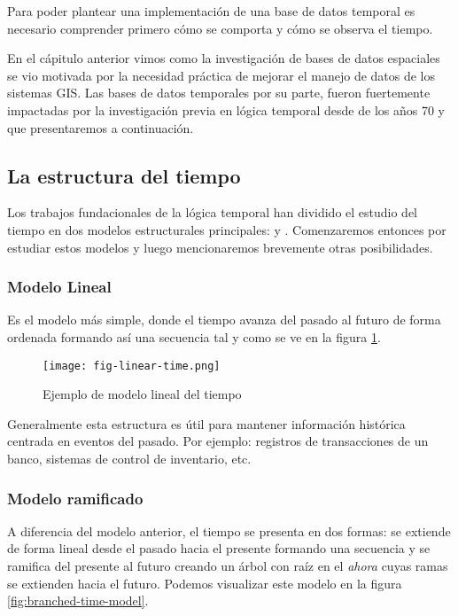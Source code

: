 Para poder plantear una implementación de una base de datos temporal es necesario comprender primero
cómo se comporta y cómo se observa el tiempo.

En el cápitulo anterior vimos como la investigación de bases de datos espaciales se vio motivada por
la necesidad práctica de mejorar el manejo de datos de los sistemas GIS.
Las bases de datos temporales por su parte, fueron fuertemente impactadas por
la investigación previa en lógica temporal desde de los años 70\textsuperscript{\cite{temporal:status:directions}}
y que presentaremos a continuación.

\subsection{La estructura del tiempo}

Los trabajos fundacionales de la lógica temporal han dividido el estudio del tiempo en dos modelos estructurales principales:
 y \textsuperscript{\cite{temporal:snodgrass}}.
Comenzaremos entonces por estudiar estos modelos y luego mencionaremos brevemente otras posibilidades.

\subsubsection{Modelo Lineal}

Es el modelo más simple, donde el tiempo avanza del pasado al futuro de forma ordenada formando así una secuencia
tal y como se ve en la figura \ref{fig:linear-time-model}.

\begin{figure}
    \centering
    \texttt{[image: fig-linear-time.png]}
    \caption{Ejemplo de modelo lineal del tiempo}
    \label{fig:linear-time-model}
\end{figure}

Generalmente esta estructura es útil para mantener información histórica centrada en eventos del pasado.
Por ejemplo: registros de transacciones de un banco, sistemas de control de inventario, etc.

\subsubsection{Modelo ramificado}

A diferencia del modelo anterior, el tiempo se presenta en dos formas:
se extiende de forma lineal desde el pasado hacia el presente formando una secuencia
y se ramifica del presente al futuro creando un árbol con raíz en el \textit{ahora} cuyas ramas se extienden hacia el futuro.
Podemos visualizar este modelo en la figura \ref{fig:branched-time-model}.

